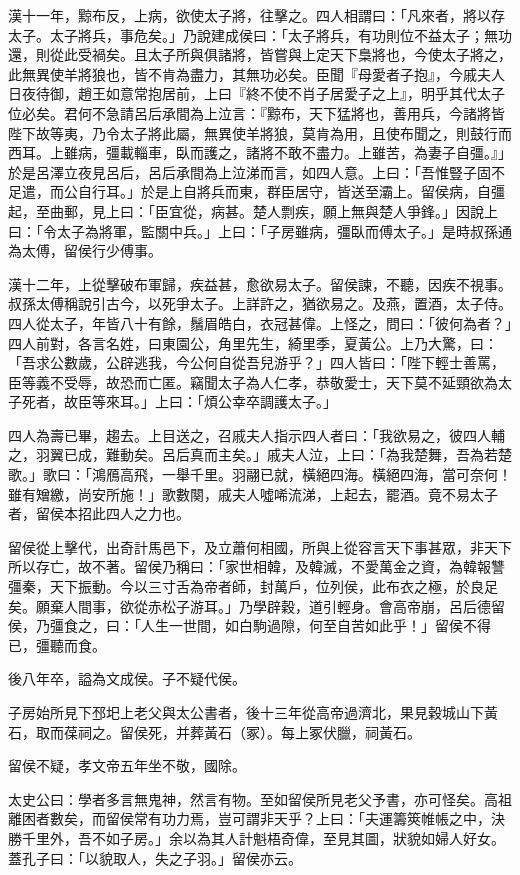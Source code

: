 \begin{pinyinscope}
漢十一年，黥布反，上病，欲使太子將，往擊之。四人相謂曰：「凡來者，將以存太子。太子將兵，事危矣。」乃說建成侯曰：「太子將兵，有功則位不益太子；無功還，則從此受禍矣。且太子所與俱諸將，皆嘗與上定天下梟將也，今使太子將之，此無異使羊將狼也，皆不肯為盡力，其無功必矣。臣聞『母愛者子抱』，今戚夫人日夜待御，趙王如意常抱居前，上曰『終不使不肖子居愛子之上』，明乎其代太子位必矣。君何不急請呂后承間為上泣言：『黥布，天下猛將也，善用兵，今諸將皆陛下故等夷，乃令太子將此屬，無異使羊將狼，莫肯為用，且使布聞之，則鼓行而西耳。上雖病，彊載輜車，臥而護之，諸將不敢不盡力。上雖苦，為妻子自彊。』」於是呂澤立夜見呂后，呂后承間為上泣涕而言，如四人意。上曰：「吾惟豎子固不足遣，而公自行耳。」於是上自將兵而東，群臣居守，皆送至灞上。留侯病，自彊起，至曲郵，見上曰：「臣宜從，病甚。楚人剽疾，願上無與楚人爭鋒。」因說上曰：「令太子為將軍，監關中兵。」上曰：「子房雖病，彊臥而傅太子。」是時叔孫通為太傅，留侯行少傅事。

漢十二年，上從擊破布軍歸，疾益甚，愈欲易太子。留侯諫，不聽，因疾不視事。叔孫太傅稱說引古今，以死爭太子。上詳許之，猶欲易之。及燕，置酒，太子侍。四人從太子，年皆八十有餘，鬚眉皓白，衣冠甚偉。上怪之，問曰：「彼何為者？」四人前對，各言名姓，曰東園公，角里先生，綺里季，夏黃公。上乃大驚，曰：「吾求公數歲，公辟逃我，今公何自從吾兒游乎？」四人皆曰：「陛下輕士善罵，臣等義不受辱，故恐而亡匿。竊聞太子為人仁孝，恭敬愛士，天下莫不延頸欲為太子死者，故臣等來耳。」上曰：「煩公幸卒調護太子。」

四人為壽已畢，趨去。上目送之，召戚夫人指示四人者曰：「我欲易之，彼四人輔之，羽翼已成，難動矣。呂后真而主矣。」戚夫人泣，上曰：「為我楚舞，吾為若楚歌。」歌曰：「鴻鴈高飛，一舉千里。羽翮已就，橫絕四海。橫絕四海，當可奈何！雖有矰繳，尚安所施！」歌數闋，戚夫人噓唏流涕，上起去，罷酒。竟不易太子者，留侯本招此四人之力也。

留侯從上擊代，出奇計馬邑下，及立蕭何相國，所與上從容言天下事甚眾，非天下所以存亡，故不著。留侯乃稱曰：「家世相韓，及韓滅，不愛萬金之資，為韓報讐彊秦，天下振動。今以三寸舌為帝者師，封萬戶，位列侯，此布衣之極，於良足矣。願棄人間事，欲從赤松子游耳。」乃學辟穀，道引輕身。會高帝崩，呂后德留侯，乃彊食之，曰：「人生一世間，如白駒過隙，何至自苦如此乎！」留侯不得已，彊聽而食。

後八年卒，謚為文成侯。子不疑代侯。

子房始所見下邳圯上老父與太公書者，後十三年從高帝過濟北，果見穀城山下黃石，取而葆祠之。留侯死，并葬黃石（冢）。每上冢伏臘，祠黃石。

留侯不疑，孝文帝五年坐不敬，國除。

太史公曰：學者多言無鬼神，然言有物。至如留侯所見老父予書，亦可怪矣。高祖離困者數矣，而留侯常有功力焉，豈可謂非天乎？上曰：「夫運籌筴帷帳之中，決勝千里外，吾不如子房。」余以為其人計魁梧奇偉，至見其圖，狀貌如婦人好女。蓋孔子曰：「以貌取人，失之子羽。」留侯亦云。


\end{pinyinscope}